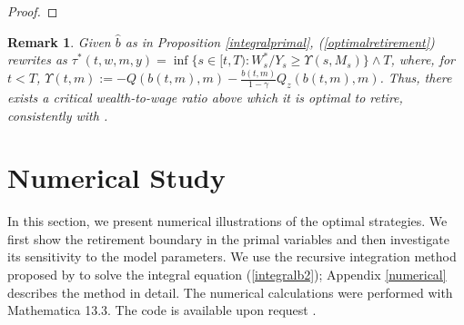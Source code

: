 \documentclass[a4paper,11pt]{amsart}
\numberwithin{equation}{section}
\newtheorem{remark}{Remark}[section]
\newcommand{\blue}[1]{{\color{black}#1}}
\begin{document}
{\begin{proof}
\end{proof}

\begin{remark}
	Given $\widehat{b}$ as in Proposition \ref{integralprimal}, (\ref{optimalretirement}) rewrites as {$\tau^\ast(t,w,m,y)=\inf\{s\in[t,T):W_s^\ast/Y_s\geq\Upsilon(s,M_s)\}\wedge T$}, where, for $t<T$, $\Upsilon(t,m):=-Q(b(t,m),m)-\frac{b(t,m)}{1-\gamma}Q_z(b(t,m),m)$. Thus, there exists a critical wealth-to-wage ratio above which it is optimal to retire, consistently with \citet{dybvig2010lifetime}.
\end{remark}



\section{Numerical Study}\label{sec6}

In this section, we present numerical illustrations of the optimal strategies. We first show the retirement boundary in the primal variables and then investigate its sensitivity to the model parameters. We use the recursive integration method proposed by \citet{huang1996pricing} to solve the integral equation (\ref{integralb2}); Appendix \ref{numerical} describes the method in detail. \blue{The numerical calculations were performed with Mathematica 13.3. The code is available  upon request .}



}
\end{document}
